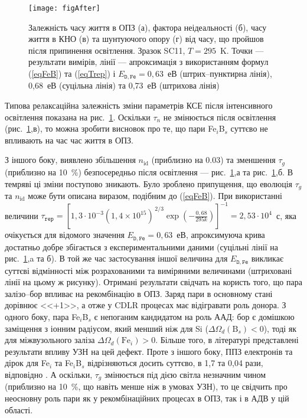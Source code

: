 \begin{figure}
\center
\texttt{[image: figAfter]}
\caption{\label{figAfter}
Залежність часу життя в ОПЗ (а),  фактора неідеальності (б), часу життя в КНО (в) та шунтуючого опору (г) від часу, що пройшов
після припинення освітлення.
Зразок SC11, $T=295$~K.
Точки --- результати вимірів,
лінії --- апроксимація з використанням формул (\ref{eqFeB}) та (\ref{eqTrep})
і $E_{\mathtt{D,Fe}}=0,63$~еВ (штрих--пунктирна лінія), 0,68~еВ (суцільна лінія) та 0,73~еВ (штрихова лінія)
}%
\end{figure}

Типова релаксаційна залежність зміни параметрів КСЕ після інтенсивного освітлення показана на рис.~\ref{figAfter}.
Оскільки $\tau_n$ не змінюється після освітлення (рис.~\ref{figAfter},в), то можна зробити висновок про те, що
пари Fe$_i$B$_s$ суттєво не впливають на час час життя в ОПЗ.

З іншого боку, виявлено збільшення $n_{\mathrm{id}}$ (приблизно на 0.03) та зменшення $\tau_g$ (приблизно на 10~\%) безпосередньо після освітлення
--- рис.~\ref{figAfter},а та рис.~\ref{figAfter},б.
В темряві ці зміни поступово зникають.
Було зроблено припущення, що еволюція $\tau_g$ та $n_{\mathrm{id}}$ може бути описана виразом, подібним до (\ref{eqFeB}).
При використанні величини $\tau_{\mathtt{rep}}=\left[1,3\cdot10^{-3}(1,4\times10^{15})^{\,2/3}\exp\left(-\frac{0,68}{295k}\right)\right]^{-1}=2,53\cdot10^4$~с,
яка очікується для відомого значення $E_{\mathtt{D,Fe}}=0,63$~еВ, апроксимуюча крива достатньо добре збігається з експериментальними даними
(суцільні лінії на рис.~\ref{figAfter},a та б).
В той же час застосування іншої величина для $E_{\mathtt{D,Fe}}$ викликає суттєві відмінності між розрахованими та виміряними величинами
(штриховані лінії на цьому ж рисунку).
Отримані результати свідчать на користь того, що пара залізо--бор впливає
на рекомбінацію в ОПЗ.
Заряд пари в основному стані дорівнює <<+1>>, а отже у CDLR процесах має відігравати роль донора.
З одного боку, пара Fe$_i$B$_s$ є непоганим кандидатом на роль ААД:
бор є домішкою заміщення з іонним радіусом, який менший ніж для Si ($\Delta\Omega_d (\mbox{B}_s)<0$),
тоді як для міжвузольного заліза $\Delta\Omega_d (\mbox{Fe}_i)>0$.
Більше того,  в літературі \cite{Ostapenko1995,OlikhFTT} представлені результати впливу УЗН на цей дефект.
Проте з іншого боку, ППЗ електронів та дірок для Fe$_i$ та Fe$_i$B$_s$ відрізняються досить суттєво, в 1,7 та 0,04 рази, відповідно \cite{MurphyJAP2011}.
А оскільки, $\tau_g$ змінюється під дією світла незначним чином (приблизно на 10~\%, що навіть менше ніж в умовах УЗН), то це свідчить про
неосновну роль пари як у рекомбінаційних процесах в ОПЗ, так і в АДВ у цій області.


